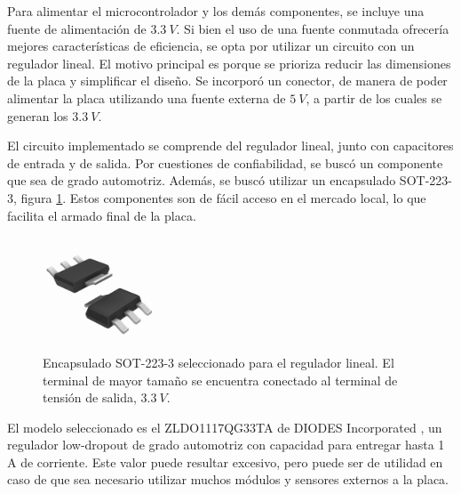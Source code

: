 Para alimentar el microcontrolador y los demás componentes, se incluye una fuente de alimentación de $3.3 \ V$. Si bien el uso de una fuente conmutada ofrecería mejores características de eficiencia, se opta por utilizar un circuito con un regulador lineal. El motivo principal es porque se prioriza reducir las dimensiones de la placa y simplificar el diseño. Se incorporó un conector, de manera de poder alimentar la placa utilizando una fuente externa de $5 \ V$, a partir de los cuales se generan los $3.3 \ V$.


El circuito implementado se comprende del regulador lineal, junto con capacitores de entrada y de salida. Por cuestiones de confiabilidad, se buscó un componente que sea de grado automotriz. Además, se buscó utilizar un encapsulado SOT-223-3, figura \ref{fig:sot_223_3}. Estos componentes son de fácil acceso en el mercado local, lo que facilita el armado final de la placa.

\begin{figure}[htb]
    \centering
    \includegraphics[width=0.3\textwidth]{img/sot_223_3.png}
    \caption{Encapsulado SOT-223-3 seleccionado para el regulador lineal. El terminal de mayor tamaño se encuentra conectado al terminal de tensión de salida, $3.3 \ V$.}
    \label{fig:sot_223_3}
\end{figure}

El modelo seleccionado es el ZLDO1117QG33TA de DIODES Incorporated \cite{ZLDO1117QG33TA}, un regulador low-dropout de grado automotriz con capacidad para entregar hasta 1 A de corriente. Este valor puede resultar excesivo, pero puede ser de utilidad en caso de que sea necesario utilizar muchos módulos y sensores externos a la placa.

